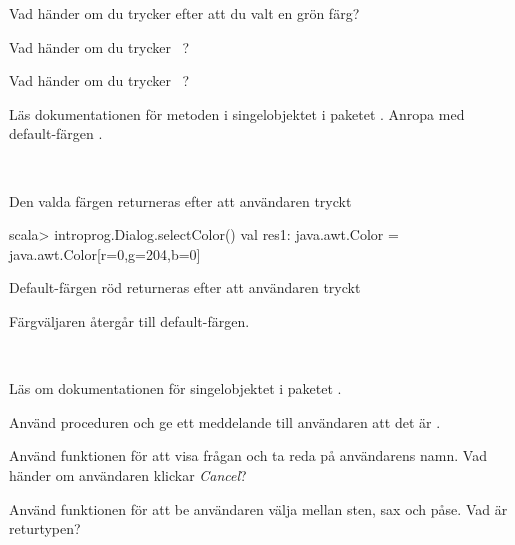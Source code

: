 \Subtask Vad händer om du trycker  efter att du valt en grön färg?

\Subtask Vad händer om du trycker ~?

\Subtask Vad händer om du trycker ~?

\Subtask Läs  dokumentationen för metoden  i singelobjektet  i paketet . Anropa  med default-färgen .

\SOLUTION

\TaskSolved \what~

\Subtask Den valda färgen returneras efter att användaren tryckt 
\begin{REPL}
scala> introprog.Dialog.selectColor()
val res1: java.awt.Color = java.awt.Color[r=0,g=204,b=0]
\end{REPL}


\Subtask Default-färgen röd returneras efter att användaren tryckt 

\Subtask Färgväljaren återgår till default-färgen.

\QUESTEND




\QUESTBEGIN

\Task \what~

\Subtask Läs om dokumentationen för singelobjektet  i paketet .

\Subtask Använd proceduren  och ge ett meddelande till användaren att det är .

\Subtask Använd funktionen  för att visa frågan  och ta reda på användarens namn. Vad händer om användaren klickar \emph{Cancel}?

\Subtask Använd funktionen  för att be användaren välja mellan sten, sax och påse. Vad är returtypen?


